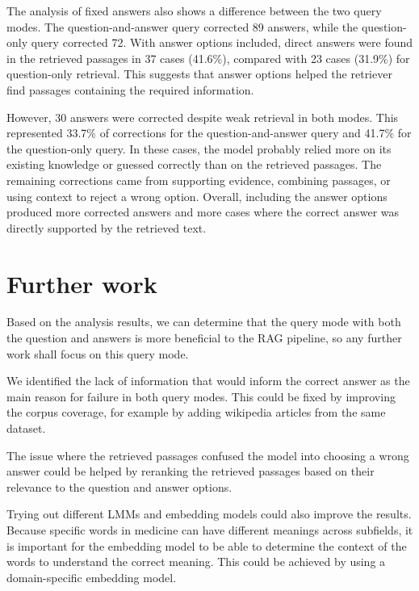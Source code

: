 \documentclass{article}
\begin{document}
The analysis of fixed answers also shows a difference between the two query
modes. The question-and-answer query corrected 89 answers, while the
question-only query corrected 72. With answer options included, direct answers
were found in the retrieved passages in 37 cases (41.6\%), compared with 23 cases
(31.9\%) for question-only retrieval. This suggests that answer options helped
the retriever find passages containing the required information.

However, 30 answers were corrected despite weak retrieval in both modes. This
represented 33.7\% of corrections for the question-and-answer query and 41.7\%
for the question-only query. In these cases, the model probably relied more on
its existing knowledge or guessed correctly than on the retrieved passages.
The remaining corrections came from supporting evidence, combining passages,
or using context to reject a wrong option. Overall, including the answer options
produced more corrected answers and more cases where the correct answer was
directly supported by the retrieved text.

\section{Further work}
Based on the analysis results, we can determine that the query mode with
both the question and answers is more beneficial to the RAG pipeline, 
so any further work shall focus on this query mode. 

We identified the lack of information that would inform the correct answer
as the main reason for failure in both query modes. This could be fixed by improving the corpus coverage,
for example by adding wikipedia articles from the same dataset.

The issue where the retrieved passages confused the model into choosing a wrong answer
could be helped by reranking the retrieved passages based on their relevance to the question and answer options.

Trying out different LMMs and embedding models could also improve the results. 
Because specific words in medicine can have different meanings across subfields, it is 
important for the embedding model to be able to determine the context of the words to understand the correct meaning. 
This could be achieved by using a domain-specific embedding model.
\end{document}
